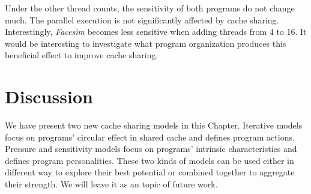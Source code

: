 Under the other thread counts, the sensitivity of both
programs do not change much.  The parallel execution is not
significantly affected by cache sharing.  Interestingly, {\em Facesim}
becomes less sensitive when adding threads from 4 to 16.  It would be
interesting to investigate what program organization produces this
beneficial effect to improve cache sharing.

\section{Discussion}

We have present two new cache sharing models in this
Chapter. Iterative models focus on programs' circular effect in shared
cache and defines program actions. Pressure and sensitivity models
focus on programs' intrinsic characteristics and defines program
personalities. These two kinds of models can be used either in
different way to explore their best potential or combined together to
aggregate their strength. We will leave it as an topic of future
work. 
